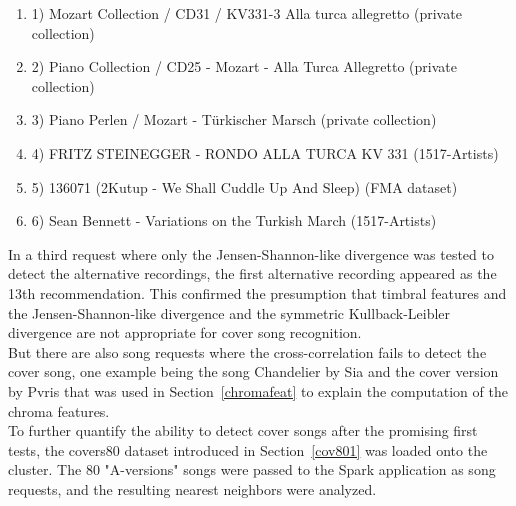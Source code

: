 \begin{enumerate}
	\setlength\itemsep{-0.5em}
	\item 1) Mozart Collection / CD31 / KV331-3 Alla turca allegretto (private collection)
	\item 2) Piano Collection / CD25 - Mozart - Alla Turca Allegretto (private collection)
	\item 3) Piano Perlen / Mozart - Türkischer Marsch (private collection)
	\item 4) FRITZ STEINEGGER - RONDO ALLA TURCA KV 331 (1517-Artists)
	\item 5) 136071 (2Kutup - We Shall Cuddle Up And Sleep) (FMA dataset) 
	\item 6) Sean Bennett - Variations on the Turkish March (1517-Artists)
\end{enumerate}

\noindent %
In a third request where only the Jensen-Shannon-like divergence was tested to detect the alternative recordings, the first alternative recording appeared as the 13th recommendation. This confirmed the presumption that timbral features and the Jensen-Shannon-like divergence and the symmetric Kullback-Leibler divergence are not appropriate for cover song recognition.\\
\noindent But there are also song requests where the cross-correlation fails to detect the cover song, one example being the song Chandelier by Sia and the cover version by Pvris that was used in Section~\ref{chromafeat} to explain the computation of the chroma features.\\
\noindent To further quantify the ability to detect cover songs after the promising first tests, the covers80 dataset introduced in Section~\ref{cov801} was loaded onto the cluster. The 80 "A-versions" songs were passed to the Spark application as song requests, and the resulting nearest neighbors were analyzed.

